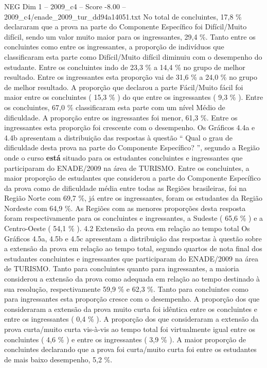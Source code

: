 \begin{textsample}{NEG Dim 1 – 2009\_c4 – Score -8.00 – 2009\_c4/enade\_2009\_tur\_dd94a14051.txt}
No total de concluintes, 17,8 \% declararam que a prova na parte do Componente Específico foi Difícil/Muito difícil, sendo um valor muito maior para os ingressantes, 29,4 \%.
Tanto entre os concluintes como entre os ingressantes, a proporção de indivíduos que classificaram esta parte como Difícil/Muito difícil diminuiu com o desempenho do estudante.
Entre os concluintes indo de 23,3 \% a 14,4 \% no grupo de melhor resultado.
Entre os ingressantes esta proporção vai de 31,6 \% a 24,0 \% no grupo de melhor resultado.
A proporção que declarou a parte Fácil/Muito fácil foi maior entre os concluintes ( 15,3 \% ) do que entre os ingressantes ( 9,3 \% ).
Entre os concluintes, 67,0 \% classificaram esta parte com um nível Médio de dificuldade.
A proporção entre os ingressantes foi menor, 61,3 \%.
Entre os ingressantes esta proporção foi crescente com o desempenho.
Os Gráficos 4.4a e 4.4b apresentam a distribuição das respostas à questão “ Qual o grau de dificuldade desta prova na parte do Componente Específico? ”, segundo a Região onde o curso \textbf{está} situado para os estudantes concluintes e ingressantes que participaram do ENADE/2009 na área de TURISMO.
Entre os concluintes, a maior proporção de estudantes que considerou a parte do Componente Específico da prova como de dificuldade média entre todas as Regiões brasileiras, foi na Região Norte com 69,7 \%, já entre os ingressantes, foram os estudantes da Região Nordeste com 64,9 \%.
As Regiões com as menores proporções desta resposta foram respectivamente para os concluintes e ingressantes, a Sudeste ( 65,6 \% ) e a Centro-Oeste ( 54,1 \% ). 4.2 Extensão da prova em relação ao tempo total Os Gráficos 4.5a, 4.5b e 4.5c apresentam a distribuição das respostas à questão sobre a extensão da prova em relação ao tempo total, segundo quartos de nota final dos estudantes concluintes e ingressantes que participaram do ENADE/2009 na área de TURISMO.
Tanto para concluintes quanto para ingressantes, a maioria considerou a extensão da prova como adequada em relação ao tempo destinado à sua resolução, respectivamente 59,9 \% e 62,3 \%.
Tanto para concluintes como para ingressantes esta proporção cresce com o desempenho.
A proporção dos que consideraram a extensão da prova muito curta foi idêntica entre os concluintes e entre os ingressantes ( 0,4 \% ).
A proporção dos que consideraram a extensão da prova curta/muito curta vis-à-vis ao tempo total foi virtualmente igual entre os concluintes ( 4,6 \% ) e entre os ingressantes ( 3,9 \% ).
A maior proporção de concluintes declarando que a prova foi curta/muito curta foi entre os estudantes de mais baixo desempenho, 5,2 \%.

\end{textsample}
